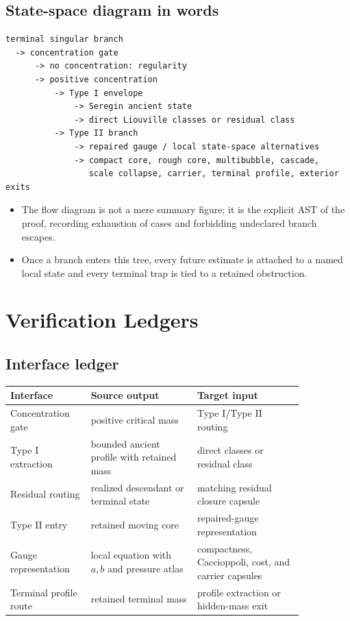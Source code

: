 \documentclass[11pt]{article}
\theoremstyle{plain}
\theoremstyle{definition}
\theoremstyle{remark}
\begin{document}
\subsection{State-space diagram in words}
\begin{lstlisting}
terminal singular branch
  -> concentration gate
      -> no concentration: regularity
      -> positive concentration
          -> Type I envelope
              -> Seregin ancient state
              -> direct Liouville classes or residual class
          -> Type II branch
              -> repaired gauge / local state-space alternatives
              -> compact core, rough core, multibubble, cascade,
                 scale collapse, carrier, terminal profile, exterior exits
\end{lstlisting}

\begin{itemize}
  \item The flow diagram is not a mere summary figure; it is the explicit AST of the proof, recording exhaustion of cases and forbidding undeclared branch escapes.
  \item Once a branch enters this tree, every future estimate is attached to a named local state and every terminal trap is tied to a retained obstruction.
\end{itemize}

\section{Verification Ledgers}
\label{sec:ledgers}

\subsection{Interface ledger}
\begin{center}
\begin{tabular}{p{0.23\linewidth}p{0.31\linewidth}p{0.31\linewidth}}
\toprule
Interface & Source output & Target input \\
\midrule
Concentration gate & positive critical mass & Type I/Type II routing \\
Type I extraction & bounded ancient profile with retained mass & direct classes or residual class \\
Residual routing & realized descendant or terminal state & matching residual closure capsule \\
Type II entry & retained moving core & repaired-gauge representation \\
Gauge representation & local equation with $a,b$ and pressure atlas & compactness, Caccioppoli, cost, and carrier capsules \\
Terminal profile route & retained terminal mass & profile extraction or hidden-mass exit \\
\bottomrule
\end{tabular}
\end{center}
\end{document}
